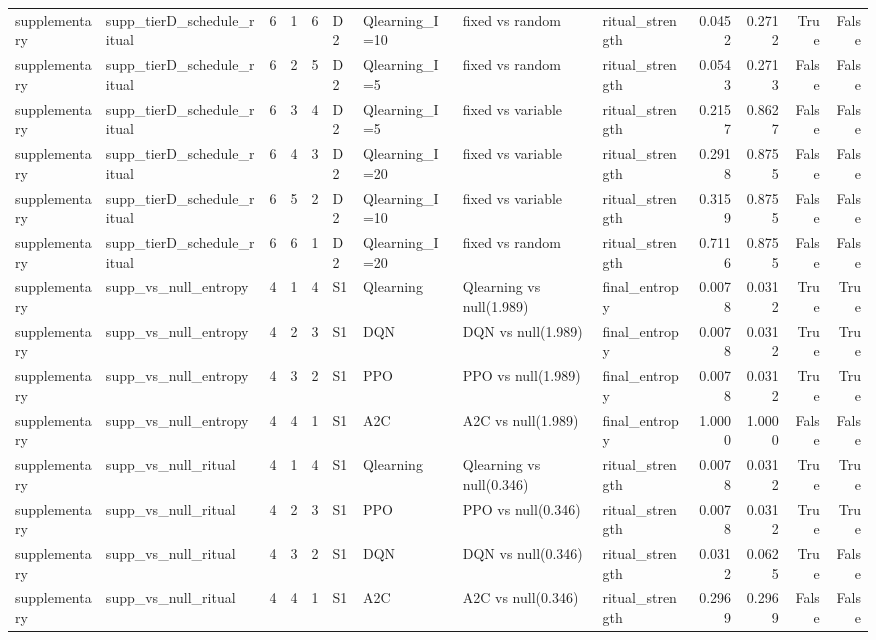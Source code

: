 \begin{tabular}{llrrrllllrrrr}
supplementary & supp_tierD_schedule_ritual & 6 & 1 & 6 & D2 & Qlearning_I=10 & fixed vs random & ritual_strength & 0.0452 & 0.2712 & True & False \\
supplementary & supp_tierD_schedule_ritual & 6 & 2 & 5 & D2 & Qlearning_I=5 & fixed vs random & ritual_strength & 0.0543 & 0.2713 & False & False \\
supplementary & supp_tierD_schedule_ritual & 6 & 3 & 4 & D2 & Qlearning_I=5 & fixed vs variable & ritual_strength & 0.2157 & 0.8627 & False & False \\
supplementary & supp_tierD_schedule_ritual & 6 & 4 & 3 & D2 & Qlearning_I=20 & fixed vs variable & ritual_strength & 0.2918 & 0.8755 & False & False \\
supplementary & supp_tierD_schedule_ritual & 6 & 5 & 2 & D2 & Qlearning_I=10 & fixed vs variable & ritual_strength & 0.3159 & 0.8755 & False & False \\
supplementary & supp_tierD_schedule_ritual & 6 & 6 & 1 & D2 & Qlearning_I=20 & fixed vs random & ritual_strength & 0.7116 & 0.8755 & False & False \\
supplementary & supp_vs_null_entropy & 4 & 1 & 4 & S1 & Qlearning & Qlearning vs null(1.989) & final_entropy & 0.0078 & 0.0312 & True & True \\
supplementary & supp_vs_null_entropy & 4 & 2 & 3 & S1 & DQN & DQN vs null(1.989) & final_entropy & 0.0078 & 0.0312 & True & True \\
supplementary & supp_vs_null_entropy & 4 & 3 & 2 & S1 & PPO & PPO vs null(1.989) & final_entropy & 0.0078 & 0.0312 & True & True \\
supplementary & supp_vs_null_entropy & 4 & 4 & 1 & S1 & A2C & A2C vs null(1.989) & final_entropy & 1.0000 & 1.0000 & False & False \\
supplementary & supp_vs_null_ritual & 4 & 1 & 4 & S1 & Qlearning & Qlearning vs null(0.346) & ritual_strength & 0.0078 & 0.0312 & True & True \\
supplementary & supp_vs_null_ritual & 4 & 2 & 3 & S1 & PPO & PPO vs null(0.346) & ritual_strength & 0.0078 & 0.0312 & True & True \\
supplementary & supp_vs_null_ritual & 4 & 3 & 2 & S1 & DQN & DQN vs null(0.346) & ritual_strength & 0.0312 & 0.0625 & True & False \\
supplementary & supp_vs_null_ritual & 4 & 4 & 1 & S1 & A2C & A2C vs null(0.346) & ritual_strength & 0.2969 & 0.2969 & False & False \\
\bottomrule
\end{tabular}
